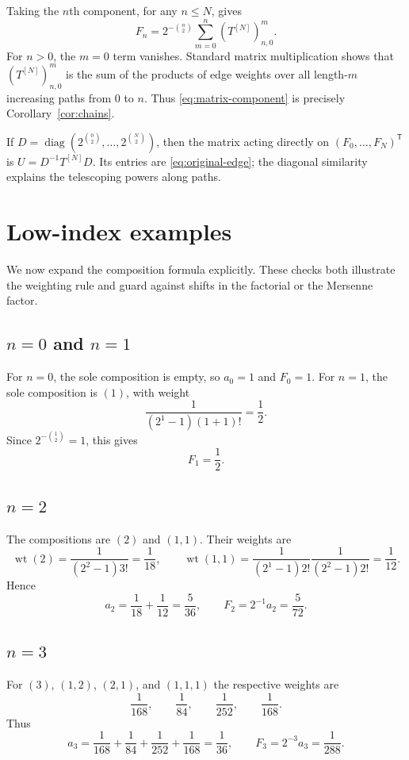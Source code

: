 \documentclass[11pt]{article}
\theoremstyle{definition}
\theoremstyle{remark}
\newcommand{\wt}{\operatorname{wt}}
\begin{document}
Taking the $n$th component, for any $n\leq N$, gives
\begin{equation}\label{eq:matrix-component}
 F_n=2^{-\binom n2}
 \sum_{m=0}^{n}(T^{[N]})^m_{n,0}.
\end{equation}
For $n>0$, the $m=0$ term vanishes.  Standard matrix multiplication shows
that $(T^{[N]})^m_{n,0}$ is the sum of the products of edge weights over all
length-$m$ increasing paths from $0$ to $n$.  Thus
\eqref{eq:matrix-component} is precisely Corollary~\ref{cor:chains}.

If $D=\operatorname{diag}(2^{\binom02},\ldots,2^{\binom N2})$, then the
matrix acting directly on $(F_0,\ldots,F_N)^{\mathsf T}$ is
$U=D^{-1}T^{[N]}D$.  Its entries are \eqref{eq:original-edge}; the diagonal
similarity explains the telescoping powers along paths.

\section{Low-index examples}\label{sec:examples}

We now expand the composition formula explicitly.  These checks both
illustrate the weighting rule and guard against shifts in the factorial or
the Mersenne factor.

\subsection*{$n=0$ and $n=1$}

For $n=0$, the sole composition is empty, so $a_0=1$ and $F_0=1$.
For $n=1$, the sole composition is $(1)$, with weight
\[
 \frac{1}{(2^1-1)(1+1)!}=\frac12.
\]
Since $2^{-\binom12}=1$, this gives
\[
 F_1=\frac12.
\]

\subsection*{$n=2$}

The compositions are $(2)$ and $(1,1)$.  Their weights are
\[
 \wt(2)=\frac{1}{(2^2-1)3!}=\frac1{18},
 \qquad
 \wt(1,1)=
 \frac1{(2^1-1)2!}\frac1{(2^2-1)2!}=\frac1{12}.
\]
Hence
\[
 a_2=\frac1{18}+\frac1{12}=\frac5{36},
 \qquad
 F_2=2^{-1}a_2=\frac5{72}.
\]

\subsection*{$n=3$}

For $(3)$, $(1,2)$, $(2,1)$, and $(1,1,1)$ the respective weights are
\[
 \frac1{168},\qquad
 \frac1{84},\qquad
 \frac1{252},\qquad
 \frac1{168}.
\]
Thus
\[
 a_3=\frac1{168}+\frac1{84}+\frac1{252}+\frac1{168}
 =\frac1{36},
 \qquad
 F_3=2^{-3}a_3=\frac1{288}.
\]
\end{document}

